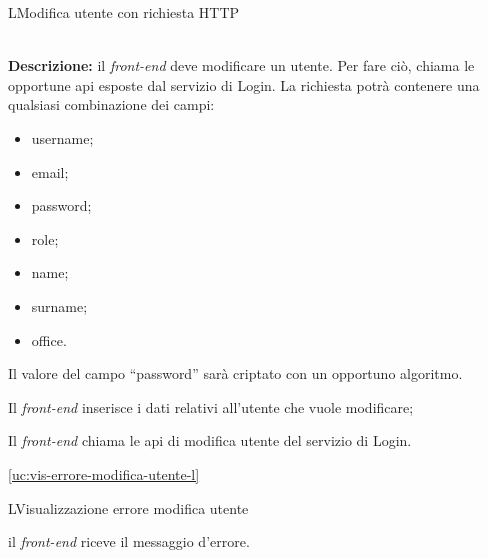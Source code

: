 \begin{usecase}{5}{L}{Modifica utente con richiesta HTTP}


	\textbf{\\Descrizione:} il \textit{front-end} deve modificare un utente. Per fare ciò,
	chiama le opportune \acrshort{api} esposte dal servizio di Login. La richiesta potrà contenere una qualsiasi combinazione dei campi:
	\begin{itemize}[noitemsep]
		\item username;
		\item email;
		\item password;
		\item role;
		\item name;
		\item surname;
		\item office.
	\end{itemize}

	Il valore del campo ``password'' sarà criptato con un opportuno algoritmo.

	\begin{ucscenarioprincipale}
		\item Il \textit{front-end} inserisce i dati relativi all'utente che vuole modificare;
		\item Il \textit{front-end} chiama le \acrshort{api} di modifica utente del servizio di Login.
	\end{ucscenarioprincipale}


	\begin{ucestensioni}
		\item \ref{uc:vis-errore-modifica-utente-l}
	\end{ucestensioni}

	\label{uc:richiesta-modifica-utente-l}
\end{usecase}

\begin{usecase}{6}{L}{Visualizzazione errore modifica utente}



	\begin{ucscenarioprincipale}
		\item il \textit{front-end} riceve il messaggio d'errore.
	\end{ucscenarioprincipale}


	\label{uc:vis-errore-modifica-utente-l}
\end{usecase}


